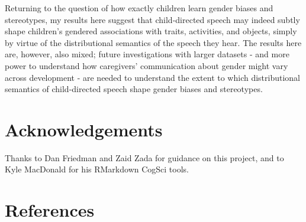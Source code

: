 \documentclass[10pt, letterpaper]{article}
\begin{document}
Returning to the question of how exactly children learn gender biases
and stereotypes, my results here suggest that child-directed speech may
indeed subtly shape children's gendered associations with traits,
activities, and objects, simply by virtue of the distributional
semantics of the speech they hear. The results here are, however, also
mixed; future investigations with larger datasets - and more power to
understand how caregivers' communication about gender might vary across
development - are needed to understand the extent to which
distributional semantics of child-directed speech shape gender biases
and stereotypes.

\hypertarget{acknowledgements}{%
\section{Acknowledgements}\label{acknowledgements}}

Thanks to Dan Friedman and Zaid Zada for guidance on this project, and
to Kyle MacDonald for his RMarkdown CogSci tools.

\hypertarget{references}{%
\section{References}\label{references}}

\setlength{\parindent}{-0.1in} 
\setlength{\leftskip}{0.125in}

\noindent
\end{document}
